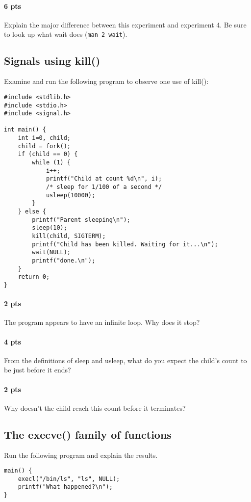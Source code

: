 \documentclass[letterpaper,10pt]{article}
\newcommand{\cmd}[1]{\texttt{#1}}
\begin{document}
\paragraph{6 pts} Explain the major difference between this experiment and experiment 4.
Be sure to look up what wait does (\cmd{man 2 wait}).

\subsection{Signals using kill()}

Examine and run the following program to observe one use of kill():
\begin{verbatim}
#include <stdlib.h>
#include <stdio.h>
#include <signal.h>

int main() {
    int i=0, child;
    child = fork();
    if (child == 0) {
        while (1) {
            i++;
            printf("Child at count %d\n", i);
            /* sleep for 1/100 of a second */
            usleep(10000);
        }
    } else {
        printf("Parent sleeping\n");
        sleep(10);
        kill(child, SIGTERM);
        printf("Child has been killed. Waiting for it...\n");
        wait(NULL);
        printf("done.\n");
    }
    return 0;
}
\end{verbatim}

\paragraph{2 pts} The program appears to have an infinite loop. Why does it stop?
\paragraph{4 pts} From the definitions of sleep and usleep, what do you expect the child's count
 to be just before it ends?
\paragraph{2 pts} Why doesn't the child reach this count before it terminates?

\subsection{The execve() family of functions}
Run the following program and explain the results.

\begin{verbatim}
main() {
    execl("/bin/ls", "ls", NULL);
    printf("What happened?\n");
}
\end{verbatim}
\end{document}
